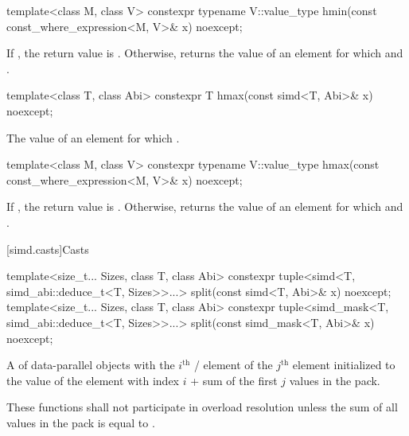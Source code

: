 \begin{itemdecl}
template<class M, class V> constexpr typename V::value_type hmin(const const_where_expression<M, V>& x) noexcept;
\end{itemdecl}

\begin{itemdescr}
  \pnum\returns
  If , the return value is . Otherwise, returns the value of an element  for which  and  \forallmaskedi.
\end{itemdescr}

\begin{itemdecl}
template<class T, class Abi> constexpr T hmax(const simd<T, Abi>& x) noexcept;
\end{itemdecl}

\begin{itemdescr}
  \pnum\returns
  The value of an element  for which  \foralli.
\end{itemdescr}

\begin{itemdecl}
template<class M, class V> constexpr typename V::value_type hmax(const const_where_expression<M, V>& x) noexcept;
\end{itemdecl}

\begin{itemdescr}
  \pnum\returns
  If , the return value is . Otherwise, returns the value of an element  for which  and  \forallmaskedi.
\end{itemdescr}

[simd.casts]{Casts}

\begin{itemdecl}
template<size_t... Sizes, class T, class Abi>
  constexpr tuple<simd<T, simd_abi::deduce_t<T, Sizes>>...>
    split(const simd<T, Abi>& x) noexcept;
template<size_t... Sizes, class T, class Abi>
  constexpr tuple<simd_mask<T, simd_abi::deduce_t<T, Sizes>>...>
    split(const simd_mask<T, Abi>& x) noexcept;
\end{itemdecl}

\begin{itemdescr}
  \pnum\returns
  A  of data-parallel objects with the $i^\text{th}$ / element of the $j^\text{th}$  element initialized to the value of the element  with index $i$ + sum of the first $j$ values in the  pack.

  \pnum\remarks
  These functions shall not participate in overload resolution unless the sum of all values in the  pack is equal to .
\end{itemdescr}

